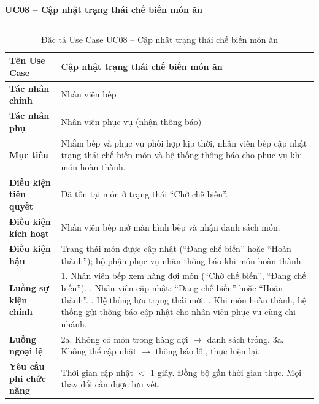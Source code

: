 ﻿\documentclass[../DoAn.tex]{subfiles}
\newcommand{\UCtitle}[1]{%
    \vspace{0.5em}
    {\large\bfseries #1}\\[-0.5em]
    \rule{\textwidth}{0.5pt}
    \vspace{0.3em}
}
\begin{document}
\begin{table}[H]
\UCtitle{UC08 – Cập nhật trạng thái chế biến món ăn}
\centering
\begin{tabular}{|p{4cm}|p{10.2cm}|}
\hline
\textbf{Tên Use Case} & Cập nhật trạng thái chế biến món ăn \\ \hline
\textbf{Tác nhân chính} & Nhân viên bếp \\ \hline
\textbf{Tác nhân phụ} & Nhân viên phục vụ (nhận thông báo) \\ \hline
\textbf{Mục tiêu} &
Nhằm bếp và phục vụ phối hợp kịp thời, nhân viên bếp cập nhật trạng thái chế biến món và hệ thống thông báo cho phục vụ khi món hoàn thành.
\\ \hline
\textbf{Điều kiện tiên quyết} & Đã tồn tại món ở trạng thái ``Chờ chế biến''. \\ \hline
\textbf{Điều kiện kích hoạt} & Nhân viên bếp mở màn hình bếp và nhận danh sách món. \\ \hline
\textbf{Điều kiện hậu} &
Trạng thái món được cập nhật (``Đang chế biến'' hoặc ``Hoàn thành''); bộ phận phục vụ nhận thông báo khi món hoàn thành.
\\ \hline
\textbf{Luồng sự kiện chính} &
1. Nhân viên bếp xem hàng đợi món (``Chờ chế biến'', ``Đang chế biến''). \newline
2. Nhân viên cập nhật: ``Đang chế biến'' hoặc ``Hoàn thành''. \newline
3. Hệ thống lưu trạng thái mới. \newline
4. Khi món hoàn thành, hệ thống gửi thông báo cập nhật cho nhân viên phục vụ cùng chi nhánh.
\\ \hline
\textbf{Luồng ngoại lệ} &
2a. Không có món trong hàng đợi $\rightarrow$ danh sách trống. \newline
3a. Không thể cập nhật $\rightarrow$ thông báo lỗi, thực hiện lại.
\\ \hline
\textbf{Yêu cầu phi chức năng} &
Thời gian cập nhật $<$ 1 giây. Đồng bộ gần thời gian thực. Mọi thay đổi cần được lưu vết.
\\ \hline
\end{tabular}
\caption{Đặc tả Use Case UC08 – Cập nhật trạng thái chế biến món ăn}
\end{table}
\end{document}
